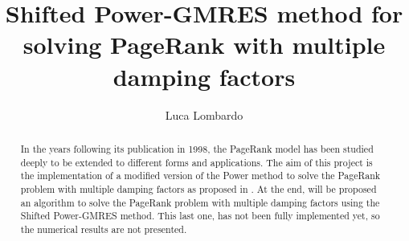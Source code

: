 \documentclass[11pt]{article}
\title{Shifted Power-GMRES method for solving PageRank with multiple damping factors}
\author{Luca Lombardo}
\date{}
\begin{document}
\maketitle

\begin{abstract}
    \noindent In the years following its publication in 1998, the PageRank model has been studied deeply to be extended to different forms and applications. The aim of this project is the implementation of a modified version of the Power method to solve the PageRank problem with multiple damping factors as proposed in \cite{SHEN2022126799}. At the end, will be proposed an algorithm to solve the PageRank problem with multiple damping factors using the Shifted Power-GMRES method. This last one, has not been fully implemented yet, so the numerical results are not presented.
\end{abstract}

\tableofcontents
\clearpage






\clearpage


\nocite{*}
\end{document}

